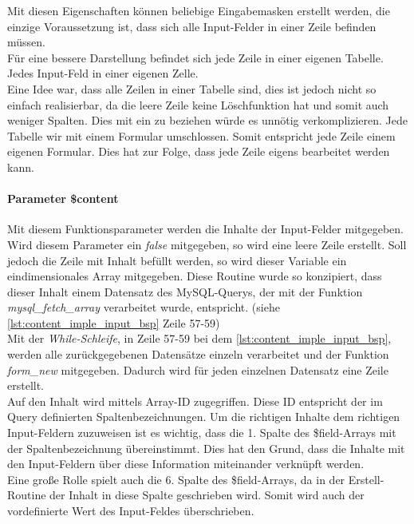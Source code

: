 Mit diesen Eigenschaften können beliebige Eingabemasken erstellt werden, die einzige Voraussetzung ist, dass sich alle Input-Felder in einer Zeile  befinden müssen.\\
Für eine bessere Darstellung befindet sich jede Zeile in einer eigenen Tabelle. Jedes Input-Feld in einer eigenen Zelle.\\
Eine Idee war, dass alle Zeilen in einer Tabelle sind, dies ist jedoch nicht so einfach realisierbar, da die leere Zeile keine Löschfunktion hat und somit auch weniger Spalten. Dies mit ein zu beziehen würde es unnötig verkomplizieren. Jede Tabelle wir mit einem Formular umschlossen. Somit entspricht jede Zeile einem eigenen Formular. Dies hat zur Folge, dass jede Zeile eigens bearbeitet werden kann.\\
\paragraph{Parameter \$content}
Mit diesem Funktionsparameter werden die Inhalte der Input-Felder mitgegeben. Wird diesem Parameter ein \textit{false} mitgegeben, so wird eine leere Zeile erstellt. Soll jedoch die Zeile mit Inhalt befüllt werden, so wird dieser Variable ein eindimensionales Array mitgegeben. Diese Routine wurde so konzipiert, dass dieser Inhalt einem Datensatz des MySQL-Querys, der mit der Funktion \textit{mysql\_fetch\_array} verarbeitet wurde, entspricht. (siehe \autoref{lst:content_imple_input_bsp} Zeile 57-59)\\
Mit der \textit{While-Schleife}, in Zeile 57-59 bei dem \autoref{lst:content_imple_input_bsp}, werden alle zurückgegebenen Datensätze einzeln verarbeitet und der Funktion \textit{form\_new} mitgegeben. Dadurch wird für jeden einzelnen Datensatz eine Zeile erstellt.\\
Auf den Inhalt wird mittels Array-ID zugegriffen. Diese ID entspricht der im Query definierten Spaltenbezeichnungen. Um die richtigen Inhalte dem richtigen Input-Feldern zuzuweisen ist es wichtig, dass die 1. Spalte des \$field-Arrays mit der Spaltenbezeichnung übereinstimmt. Dies hat den Grund, dass die Inhalte mit den Input-Feldern über diese Information miteinander verknüpft werden.\\
Eine große Rolle spielt auch die 6. Spalte des \$field-Arrays, da in der Erstell-Routine der Inhalt in diese Spalte geschrieben wird. Somit wird auch der vordefinierte Wert des Input-Feldes überschrieben.\\
\\

